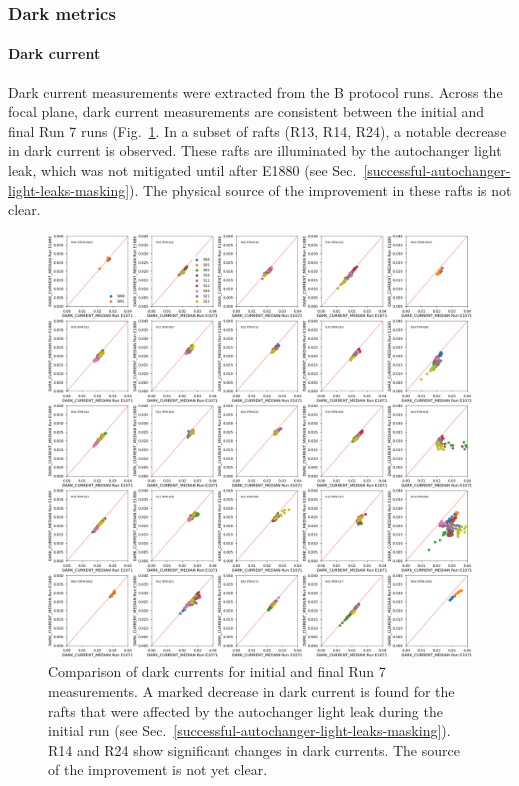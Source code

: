 \clearpage

\subsubsection{Dark metrics}\label{final-dark-metrics}

\paragraph{Dark current}\label{sec:finaldark-current}

Dark current measurements were extracted from the B protocol runs. Across the focal plane, dark current measurements are consistent between the initial and final Run 7 runs (Fig.~\ref{fig:finalChar-DarkCurrent-5x5}. In a subset of rafts (R13, R14, R24), a notable decrease in dark current is observed. These rafts are illuminated by the autochanger light leak, which was not mitigated until after E1880 (see Sec.~\ref{successful-autochanger-light-leaks-masking}). The physical source of the improvement in these rafts is not clear.

\begin{figure}[ht]
    \centering
    \includegraphics[width=0.7\linewidth]{figures/finalCharacterization/E1071_E1880_DARK_CURRENT_MEDIAN.png}
    \caption{Comparison of dark currents for initial and final Run 7 measurements. A marked decrease in dark current is found for the rafts that were affected by the autochanger light leak during the initial run (see Sec.~\ref{successful-autochanger-light-leaks-masking}). R14 and R24 show significant changes in dark currents. The source of the improvement is not yet clear.}
    \label{fig:finalChar-DarkCurrent-5x5}
\end{figure}

